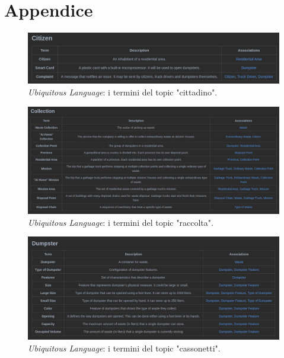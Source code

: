 \section*{Appendice}

\begin{figure}[H]
    \centering
    \includegraphics[width=\textwidth]{img/citizen-ubiquitous-language}
    \caption{\textit{Ubiquitous Language}: i termini del topic "cittadino".}
    \label{fig:img/citizen-ubiquitous-language}
\end{figure}


\begin{figure}[H]
    \centering
    \includegraphics[width=\textwidth]{img/collection-ubiquitous-language}
    \caption{\textit{Ubiquitous Language}: i termini del topic "raccolta".}
    \label{fig:img/collection-ubiquitous-language}
\end{figure}


\begin{figure}[H]
    \centering
    \includegraphics[width=\textwidth]{img/dumpster-ubiquitous-language}
    \caption{\textit{Ubiquitous Language}: i termini del topic "cassonetti".}
    \label{fig:img/dumpster-ubiquitous-language}
\end{figure}


